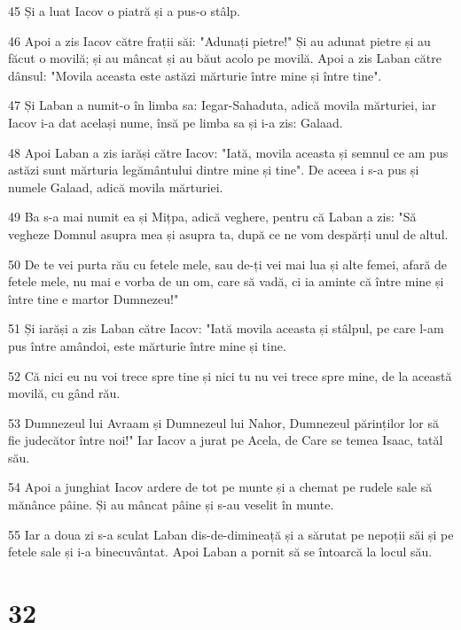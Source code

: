 \par 45 Și a luat Iacov o piatră și a pus-o stâlp.
\par 46 Apoi a zis Iacov către frații săi: "Adunați pietre!" Și au adunat pietre și au făcut o movilă; și au mâncat și au băut acolo pe movilă. Apoi a zis Laban către dânsul: "Movila aceasta este astăzi mărturie între mine și între tine".
\par 47 Și Laban a numit-o în limba sa: Iegar-Sahaduta, adică movila mărturiei, iar Iacov i-a dat același nume, însă pe limba sa și i-a zis: Galaad.
\par 48 Apoi Laban a zis iarăși către Iacov: "Iată, movila aceasta și semnul ce am pus astăzi sunt mărturia legământului dintre mine și tine". De aceea i s-a pus și numele Galaad, adică movila mărturiei.
\par 49 Ba s-a mai numit ea și Mițpa, adică veghere, pentru că Laban a zis: "Să vegheze Domnul asupra mea și asupra ta, după ce ne vom despărți unul de altul.
\par 50 De te vei purta rău cu fetele mele, sau de-ți vei mai lua și alte femei, afară de fetele mele, nu mai e vorba de un om, care să vadă, ci ia aminte că între mine și între tine e martor Dumnezeu!"
\par 51 Și iarăși a zis Laban către Iacov: "Iată movila aceasta și stâlpul, pe care l-am pus între amândoi, este mărturie între mine și tine.
\par 52 Că nici eu nu voi trece spre tine și nici tu nu vei trece spre mine, de la această movilă, cu gând rău.
\par 53 Dumnezeul lui Avraam și Dumnezeul lui Nahor, Dumnezeul părinților lor să fie judecător între noi!" Iar Iacov a jurat pe Acela, de Care se temea Isaac, tatăl său.
\par 54 Apoi a junghiat Iacov ardere de tot pe munte și a chemat pe rudele sale să mănânce pâine. Și au mâncat pâine și s-au veselit în munte.
\par 55 Iar a doua zi s-a sculat Laban dis-de-dimineață și a sărutat pe nepoții săi și pe fetele sale și i-a binecuvântat. Apoi Laban a pornit să se întoarcă la locul său.

\chapter{32}

